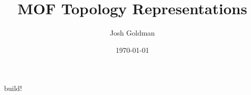\documentclass{article}
\title{MOF Topology Representations}
\author{Josh Goldman}
\date{\today}
\begin{document}
\maketitle

\tableofcontents

build!



\printbibliography
\end{document}
